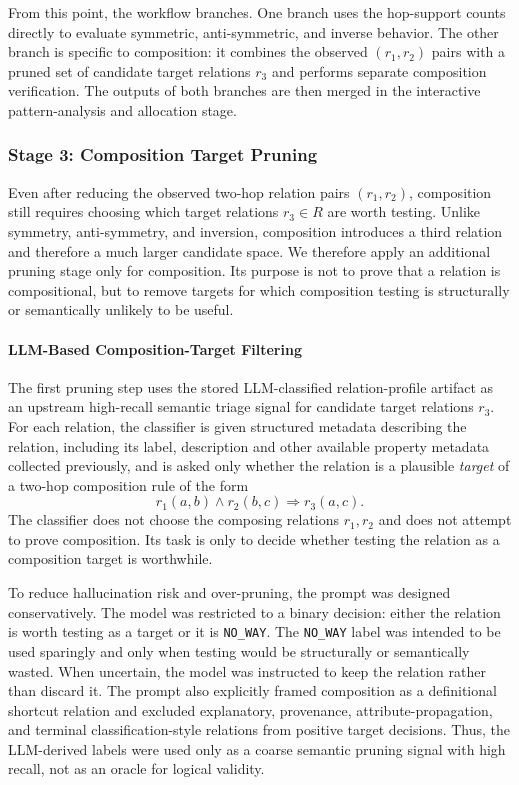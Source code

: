 \documentclass[12pt,a4paper]{article}
\begin{document}
From this point, the workflow branches. One branch uses the hop-support counts directly to evaluate symmetric, anti-symmetric, and inverse behavior. The other branch is specific to composition: it combines the observed $(r_1,r_2)$ pairs with a pruned set of candidate target relations $r_3$ and performs separate composition verification. The outputs of both branches are then merged in the interactive pattern-analysis and allocation stage.

\subsubsection{Stage 3: Composition Target Pruning}

Even after reducing the observed two-hop relation pairs $(r_1,r_2)$, composition still requires choosing which target relations $r_3 \in R$ are worth testing. Unlike symmetry, anti-symmetry, and inversion, composition introduces a third relation and therefore a much larger candidate space. We therefore apply an additional pruning stage only for composition. Its purpose is not to prove that a relation is compositional, but to remove targets for which composition testing is structurally or semantically unlikely to be useful.

\paragraph{LLM-Based Composition-Target Filtering}

The first pruning step uses the stored LLM-classified relation-profile artifact as an upstream high-recall semantic triage signal for candidate target relations $r_3$. For each relation, the classifier is given structured metadata describing the relation, including its label, description and other available property metadata collected previously, and is asked only whether the relation is a plausible \emph{target} of a two-hop composition rule of the form
\[
r_1(a,b) \wedge r_2(b,c) \Rightarrow r_3(a,c).
\]
The classifier does not choose the composing relations $r_1,r_2$ and does not attempt to prove composition. Its task is only to decide whether testing the relation as a composition target is worthwhile.

To reduce hallucination risk and over-pruning, the prompt was designed conservatively. The model was restricted to a binary decision: either the relation is worth testing as a target or it is \texttt{NO\_WAY}. The \texttt{NO\_WAY} label was intended to be used sparingly and only when testing would be structurally or semantically wasted. When uncertain, the model was instructed to keep the relation rather than discard it. The prompt also explicitly framed composition as a definitional shortcut relation and excluded explanatory, provenance, attribute-propagation, and terminal classification-style relations from positive target decisions. Thus, the LLM-derived labels were used only as a coarse semantic pruning signal with high recall, not as an oracle for logical validity.
\end{document}
